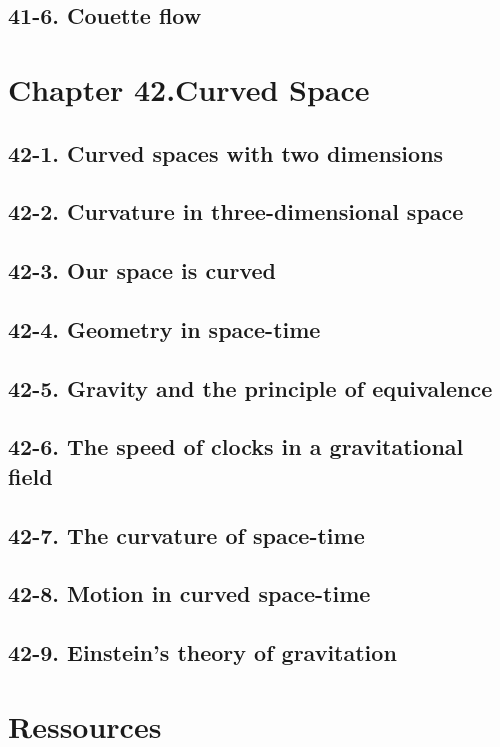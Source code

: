 \documentclass{article}
\begin{document}
\subsection{41-6. Couette flow}
\section{Chapter 42.Curved Space}
\subsection{42-1. Curved spaces with two dimensions}
\subsection{42-2. Curvature in three-dimensional space}
\subsection{42-3. Our space is curved}
\subsection{42-4. Geometry in space-time}
\subsection{42-5. Gravity and the principle of equivalence}
\subsection{42-6. The speed of clocks in a gravitational field}
\subsection{42-7. The curvature of space-time}
\subsection{42-8. Motion in curved space-time}
\subsection{42-9. Einstein’s theory of gravitation}

\section{Ressources}%
\label{sec:Ressources}
\end{document}
